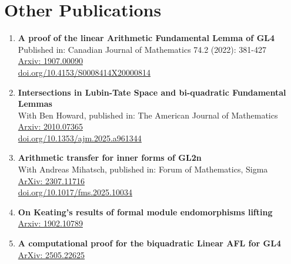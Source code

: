 \documentclass[a4paper,10pt]{article}
\begin{document}
\section*{Other Publications}
\begin{enumerate}
    \item \textbf{A proof of the linear Arithmetic Fundamental Lemma of GL4} \\
    Published in: Canadian Journal of Mathematics 74.2 (2022): 381-427 \\
    \href{https://arxiv.org/abs/1907.00090}{Arxiv: 1907.00090}\\
	\href{https://doi.org/10.4153/S0008414X20000814}{doi.org/10.4153/S0008414X20000814}
    \item \textbf{Intersections in Lubin-Tate Space and bi-quadratic Fundamental Lemmas} \\
    With Ben Howard, published in: The American Journal of Mathematics \\
    \href{https://arxiv.org/abs/2010.07365}{Arxiv: 2010.07365}\\
	\href{https://doi.org/10.1353/ajm.2025.a961344}{doi.org/10.1353/ajm.2025.a961344}
    \item \textbf{Arithmetic transfer for inner forms of GL2n} \\
    With Andreas Mihatsch, published in: Forum of Mathematics, Sigma \\
    \href{https://arxiv.org/abs/2307.11716}{ArXiv: 2307.11716}\\
	\href{https://doi.org/10.1017/fms.2025.10034}{doi.org/10.1017/fms.2025.10034}
    \item \textbf{On Keating's results of formal module endomorphisms lifting} \\
    \href{https://arxiv.org/abs/1902.10789}{Arxiv: 1902.10789}
    \item \textbf{A computational proof for the biquadratic Linear AFL for GL4} \\
	\href{https://arxiv.org/abs/2505.22625}{ArXiv: 2505.22625}
\end{enumerate}
\end{document}
